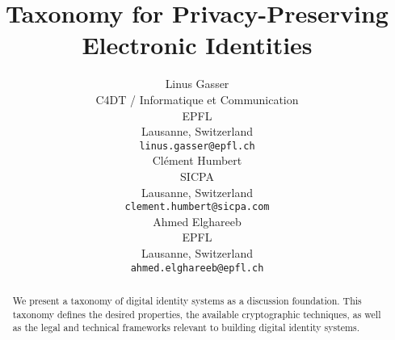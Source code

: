 \documentclass{article}
\title{Taxonomy for Privacy-Preserving Electronic Identities}
\author{
 Linus Gasser \\
  C4DT / Informatique et Communication \\
  EPFL \\
  Lausanne, Switzerland \\
  \texttt{linus.gasser@epfl.ch} \\
  \AND
 Cl\'ement Humbert \\
  SICPA \\
  Lausanne, Switzerland \\
  \texttt{clement.humbert@sicpa.com} \\
  \AND
 Ahmed Elghareeb \\
  EPFL \\
  Lausanne, Switzerland \\
  \texttt{ahmed.elghareeb@epfl.ch} \\
}
\begin{document}
\newcommand{\eid}{e-ID\xspace}
\newcommand{\rot}{Trust and Threats\xspace}
\newcommand{\sfi}{Solution Foundation and Implementation\xspace}
\newcommand{\rnf}{Regulatory and Normative Frameworks\xspace}
\newcommand{\swiyu}{Swiyu\xspace}

\maketitle
\begin{abstract}
We present a taxonomy of digital identity systems as a discussion foundation.
This taxonomy defines the desired properties, the available
cryptographic techniques, as well as the legal and technical
frameworks relevant to building digital identity systems.
\end{abstract}
















  

\end{document}
